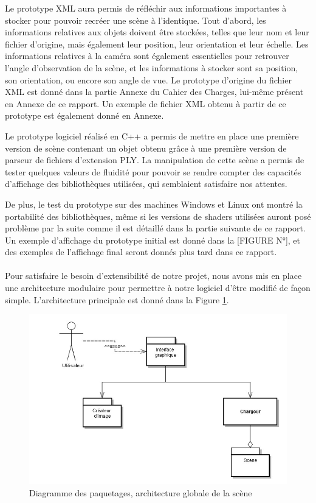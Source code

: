         Le prototype XML aura permis de réfléchir aux informations importantes à stocker pour pouvoir recréer une scène à l'identique. Tout d'abord, les informations relatives aux objets doivent être stockées, telles que leur nom et leur fichier d'origine, mais également leur position, leur orientation et leur échelle. Les informations relatives à la caméra sont également essentielles pour retrouver l'angle d'observation de la scène, et les informations à stocker sont sa position, son orientation, ou encore son angle de vue. Le prototype d'origine du fichier XML est donné dans la partie Annexe du Cahier des Charges, lui-même présent en Annexe de ce rapport. Un exemple de fichier XML obtenu à partir de ce prototype est également donné en Annexe.

        Le prototype logiciel réalisé en C++ a permis de mettre en place une première version de scène contenant un objet obtenu grâce à une première version de parseur de fichiers d'extension PLY. La manipulation de cette scène a permis de tester quelques valeurs de fluidité pour pouvoir se rendre compter des capacités d'affichage des bibliothèques utilisées, qui semblaient satisfaire nos attentes. 
        
        De plus, le test du prototype sur des machines Windows et Linux ont montré la portabilité des bibliothèques, même si les versions de shaders utilisées auront posé problème par la suite comme il est détaillé dans la partie suivante de ce rapport. Un exemple d'affichage du prototype initial est donné dans la [FIGURE N°], et des exemples de l'affichage final seront donnés plus tard dans ce rapport.

\paragraph{}
        Pour satisfaire le besoin d'extensibilité de notre projet, nous avons mis en place une architecture modulaire pour permettre à notre logiciel d'être modifié de façon simple. L'architecture principale est donné dans la Figure \ref{fig:archi}.

\begin{figure}[h]
	\centering      
	\includegraphics[scale=0.5]{diag_packages.jpg}
	\caption{\label{fig:archi} Diagramme des paquetages, architecture globale de la scène \protect \footnotemark }
\end{figure}

